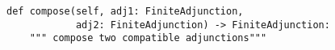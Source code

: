 \begin{verbatim}
def compose(self, adj1: FiniteAdjunction,
            adj2: FiniteAdjunction) -> FiniteAdjunction:
    """ compose two compatible adjunctions"""
\end{verbatim}